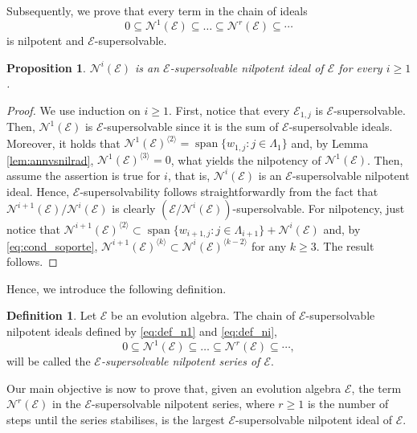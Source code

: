 \documentclass[12pt,reqno]{amsart}
\newtheorem{proposition}[theorem]{Proposition}
\theoremstyle{definition}
\newtheorem{definition}[theorem]{Definition}
\theoremstyle{remark}
\DeclareMathOperator{\spa}{span}
\numberwithin{equation}{section}
\begin{document}
Subsequently, we prove that every term in the chain of ideals
\[0\subseteq\mathcal{N}^1(\mathcal{E})\subseteq\dots\subseteq\mathcal{N}^r(\mathcal{E})\subseteq\cdots\] is nilpotent and $\mathcal{E}$-supersolvable. 

\begin{proposition}\label{prop:nilp_super}
	$\mathcal{N}^{i}(\mathcal{E})$ is an $\mathcal{E}$-supersolvable nilpotent ideal of $\mathcal{E}$ for every $i\geq1$.
\end{proposition}
\begin{proof}
	We use induction on $i\geq1$. First, notice that every $\mathcal{E}_{1,j}$ is $\mathcal{E}$-supersolvable. Then, $\mathcal{N}^1(\mathcal{E})$ is $\mathcal{E}$-supersolvable since it is the sum of $\mathcal{E}$-supersolvable ideals.  Moreover, it holds that $\mathcal{N}^1(\mathcal{E})^{\langle2\rangle}=\spa\{w_{1,j}\colon j\in\varLambda_1\}$ and, by Lemma \ref{lem:annvsnilrad}, $\mathcal{N}^1(\mathcal{E})^{\langle3\rangle}=0$, what yields the nilpotency of $\mathcal{N}^1(\mathcal{E})$. Then, assume the assertion is true for $i$, that is, $\mathcal{N}^{i}(\mathcal{E})$ is an $\mathcal{E}$-supersolvable nilpotent ideal. Hence, $\mathcal{E}$-supersolvability follows straightforwardly from the fact that $\mathcal{N}^{i+1}(\mathcal{E})/\mathcal{N}^{i}(\mathcal{E})$ is clearly $(\mathcal{E}/\mathcal{N}^{i}(\mathcal{E}))$-supersolvable. For nilpotency, just notice that $\mathcal{N}^{i+1}(\mathcal{E})^{\langle2\rangle}\subset\spa\{w_{i+1,j}\colon j\in\varLambda_{i+1}\}+\mathcal{N}^{i}(\mathcal{E})$ and, by \eqref{eq:cond_soporte}, $\mathcal{N}^{i+1}(\mathcal{E})^{\langle k\rangle}\subset\mathcal{N}^{i}(\mathcal{E})^{\langle k-2\rangle}$ for any $k\geq3$. The result follows.
\end{proof}
Hence, we introduce the following definition.
\begin{definition}\label{def:super_nilp}
	Let $\mathcal{E}$ be an evolution algebra. The chain of $\mathcal{E}$-supersolvable nilpotent ideals defined by \eqref{eq:def_n1} and \eqref{eq:def_ni},
	\[0\subseteq\mathcal{N}^1(\mathcal{E})\subseteq\dots\subseteq\mathcal{N}^r(\mathcal{E})\subseteq\cdots,\] will be called the \textit{$\mathcal{E}$-supersolvable nilpotent series of $\mathcal{E}$}.
\end{definition}

Our main objective is now to prove that, given an evolution algebra $\mathcal{E}$, the term $\mathcal{N}^r(\mathcal{E})$ in the $\mathcal{E}$-supersolvable nilpotent series, where $r\geq1$ is the number of steps until the series stabilises, is the largest $\mathcal{E}$-supersolvable nilpotent ideal of $\mathcal{E}$.
\end{document}
